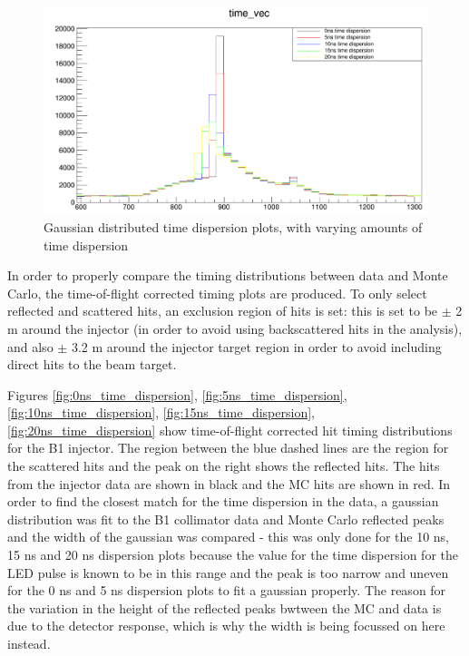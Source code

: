 \begin{figure}
    \centering
    \includegraphics[width=\textwidth]{Figures/gauss_time_dispersion.PNG}
    \caption{Gaussian distributed time dispersion plots, with varying amounts of time dispersion}
    \label{fig:gauss_time_dispersion}
\end{figure}

In order to properly compare the timing distributions between data and Monte Carlo, the time-of-flight corrected timing plots are produced. To only select reflected and scattered hits, an exclusion region of hits is set: this is set to be $\pm$ 2 m around the injector (in order to avoid using backscattered hits in the analysis), and also $\pm$ 3.2 m around the injector target region in order to avoid including direct hits to the beam target.

Figures \ref{fig:0ns_time_dispersion}, \ref{fig:5ns_time_dispersion}, \ref{fig:10ns_time_dispersion}, \ref{fig:15ns_time_dispersion}, \ref{fig:20ns_time_dispersion} show time-of-flight corrected hit timing distributions for the B1 injector. The region between the blue dashed lines are the region for the scattered hits and the peak on the right shows the reflected hits. The hits from the injector data are shown in black and the MC hits are shown in red. In order to find the closest match for the time dispersion in the data, a gaussian distribution was fit to the B1 collimator data and Monte Carlo reflected peaks and the width of the gaussian was compared - this was only done for the 10 ns, 15 ns and 20 ns dispersion plots because the value for the time dispersion for the LED pulse is known to be in this range and the peak is too narrow and uneven for the 0 ns and 5 ns dispersion plots to fit a gaussian properly. The reason for the variation in the height of the reflected peaks bwtween the MC and data is due to the detector response, which is why the width is being focussed on here instead.

